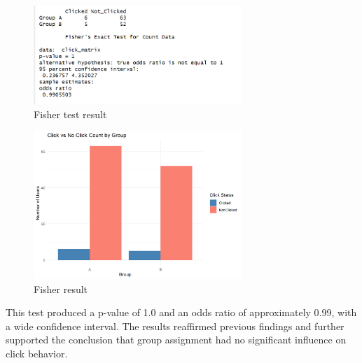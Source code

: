 \documentclass[
  letterpaper,
  DIV=11,
  numbers=noendperiod]{scrartcl}
\begin{document}
\begin{figure}[H]

{\centering \includegraphics[width=0.7\textwidth,height=\textheight]{data_ana_pj3_files/fisher.png}

}

\caption{Fisher test result}

\end{figure}%
\begin{figure}[H]

{\centering \includegraphics[width=0.7\textwidth,height=\textheight]{data_ana_pj3_files/figure-html/unnamed-chunk-7-1.png}

}

\caption{Fisher result}

\end{figure}%

This test produced a p-value of 1.0 and an odds ratio of approximately
0.99, with a wide confidence interval. The results reaffirmed previous
findings and further supported the conclusion that group assignment had
no significant influence on click behavior.
\end{document}

